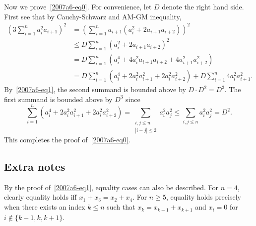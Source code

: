 Now we prove~\eqref{2007a6-eq0}.
For convenience, let $D$ denote the right hand side.
First see that by Cauchy-Schwarz and AM-GM inequality,
\begin{align*}
    \left(3 \sum_{i = 1}^n a_i^2 a_{i + 1}\right)^2
    &= \left(\sum_{i = 1}^n a_{i + 1} (a_i^2 + 2 a_{i + 1} a_{i + 2})\right)^2 \\
    &\leq D \sum_{i = 1}^n (a_i^2 + 2 a_{i + 1} a_{i + 2})^2 \\
    &= D \sum_{i = 1}^n (a_i^4 + 4 a_i^2 a_{i + 1} a_{i + 2} + 4 a_{i + 1}^2 a_{i + 2}^2) \\
    &= D \sum_{i = 1}^n (a_i^4 + 2 a_i^2 a_{i + 1}^2 + 2 a_i^2 a_{i + 2}^2) + D \sum_{i = 1}^n 4 a_i^2 a_{i + 1}^2.
\end{align*}
By~\eqref{2007a6-eq1}, the second summand is bounded above by $D \cdot D^2 = D^3$.
The first summand is bounded above by $D^3$ since
\[ \sum_{i = 1}^n (a_i^4 + 2 a_i^2 a_{i + 1}^2 + 2 a_i^2 a_{i + 2}^2)
    = \sum_{\substack{i, j \leq n \\ |i - j| \leq 2}} a_i^2 a_j^2 \leq \sum_{i, j \leq n} a_i^2 a_j^2 = D^2. \]
This completes the proof of~\eqref{2007a6-eq0}.



\subsection*{Extra notes}

By the proof of~\eqref{2007a6-eq1}, equality cases can also be described.
For $n = 4$, clearly equality holds iff $x_1 + x_3 = x_2 + x_4$.
For $n \geq 5$, equality holds precisely when there exists an index $k \leq n$ such that $x_k = x_{k - 1} + x_{k + 1}$ and $x_i = 0$ for $i \notin \{k - 1, k, k + 1\}$.
